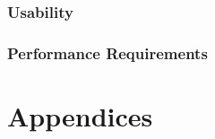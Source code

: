 \documentclass[12pt]{article}
\begin{document}
                  	\subsubsection{Usability}
                  	
                  	\subsubsection{Performance Requirements}
                
                \section{Appendices}
        
                
                        
        
        
\end{document}
